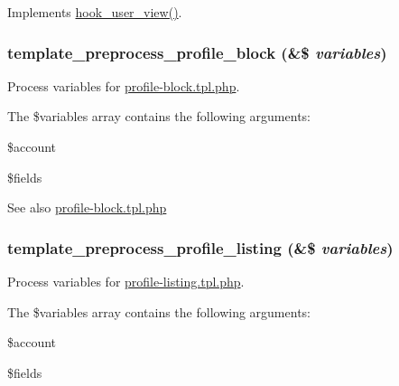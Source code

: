 \label{profile_8module_a41afe6040449cd3066939e034cdd7b57}
Implements \hyperlink{group__hooks_gaafb9e35d1f82a33918437ad7acf29541}{hook\_\-user\_\-view()}. \hypertarget{profile_8module_ac67229ab98fe8f88094d3db5e7918040}{
\subsubsection[{template\_\-preprocess\_\-profile\_\-block}]{\setlength{\rightskip}{0pt plus 5cm}template\_\-preprocess\_\-profile\_\-block (\&\$ {\em variables})}}
\label{profile_8module_ac67229ab98fe8f88094d3db5e7918040}
Process variables for \hyperlink{profile-block_8tpl_8php}{profile-\/block.tpl.php}.

The \$variables array contains the following arguments:
\begin{DoxyItemize}
\item \$account
\item \$fields
\end{DoxyItemize}

\begin{DoxySeeAlso}{See also}
\hyperlink{profile-block_8tpl_8php}{profile-\/block.tpl.php} 
\end{DoxySeeAlso}
\hypertarget{profile_8module_a7dc89cd06dce412d737449102c65c5d5}{
\subsubsection[{template\_\-preprocess\_\-profile\_\-listing}]{\setlength{\rightskip}{0pt plus 5cm}template\_\-preprocess\_\-profile\_\-listing (\&\$ {\em variables})}}
\label{profile_8module_a7dc89cd06dce412d737449102c65c5d5}
Process variables for \hyperlink{profile-listing_8tpl_8php}{profile-\/listing.tpl.php}.

The \$variables array contains the following arguments:
\begin{DoxyItemize}
\item \$account
\item \$fields
\end{DoxyItemize}

